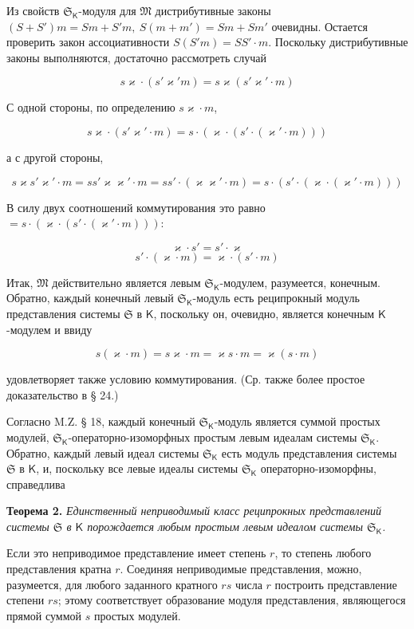 \documentclass[11pt]{article}
\begin{document}
Из свойств \(\mathfrak S_{\mathsf K}\)-модуля для \(\mathfrak M\) дистрибутивные законы \((S+S')m=Sm+S'm,\ S(m+m')=Sm+Sm'\) очевидны. Остается проверить закон ассоциативности \(S(S'm)=SS'\cdot m\). Поскольку дистрибутивные законы выполняются, достаточно рассмотреть случай

\[
s\varkappa \cdot(s'\varkappa ' m)=s\varkappa (s'\varkappa '\cdot m)
\]

С одной стороны, по определению \(s\varkappa \cdot m\),

\[
s\varkappa \cdot(s'\varkappa '\cdot m)=s\cdot(\varkappa \cdot(s'\cdot(\varkappa '\cdot m)))
\]

а с другой стороны,

\[
s\varkappa  s'\varkappa '\cdot m=ss'\varkappa \varkappa '\cdot m=ss'\cdot(\varkappa \varkappa '\cdot m)
=s\cdot(s'\cdot(\varkappa \cdot(\varkappa '\cdot m)))
\]

В силу двух соотношений коммутирования это равно \(=s\cdot(\varkappa \cdot(s'\cdot(\varkappa '\cdot m)))\):

\[
\varkappa \cdot s'=s'\cdot \varkappa
\]
\[
s'\cdot(\varkappa \cdot m)=\varkappa \cdot(s'\cdot m)
\]

Итак, \(\mathfrak M\) действительно является левым \(\mathfrak S_{\mathsf K}\)-модулем, разумеется, конечным. Обратно, каждый конечный левый \(\mathfrak S_{\mathsf K}\)-модуль есть реципрокный модуль представления системы \(\mathfrak S\) в \(\mathsf K\), поскольку он, очевидно, является конечным \(\mathsf K\)-модулем и ввиду

\[
s(\varkappa \cdot m)=s\varkappa \cdot m=\varkappa s\cdot m=\varkappa (s\cdot m)
\]

удовлетворяет также условию коммутирования. (Ср. также более простое доказательство в § 24.)

Согласно M.Z. § 18, каждый конечный \(\mathfrak S_{\mathsf K}\)-модуль является суммой простых модулей, \(\mathfrak S_{\mathsf K}\)-операторно-изоморфных простым левым идеалам системы \(\mathfrak S_{\mathsf K}\). Обратно, каждый левый идеал системы \(\mathfrak S_{\mathsf K}\) есть модуль представления системы \(\mathfrak S\) в \(\mathsf K\), и, поскольку все левые идеалы системы \(\mathfrak S_{\mathsf K}\) операторно-изоморфны, справедлива

\textbf{Теорема 2.} \emph{Единственный неприводимый класс реципрокных представлений системы \(\mathfrak S\) в \(\mathsf K\) порождается любым простым левым идеалом системы \(\mathfrak S_{\mathsf K}\).}

Если это неприводимое представление имеет степень \(r\), то степень любого представления кратна \(r\). Соединяя неприводимые представления, можно, разумеется, для любого заданного кратного \(rs\) числа \(r\) построить представление степени \(rs\); этому соответствует образование модуля представления, являющегося прямой суммой \(s\) простых модулей.
\end{document}
